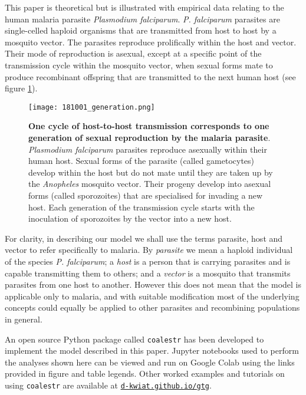 \documentclass[_main.tex]{subfiles}
\begin{document}
This paper is theoretical but is illustrated with empirical data relating to the human malaria parasite \textit{Plasmodium falciparum}.  \textit{P. falciparum} parasites are single-celled haploid organisms that are transmitted from host to host by a mosquito vector.  The parasites reproduce prolifically within the host and vector.  Their mode of reproduction is asexual, except at a specific point of the transmission cycle within the mosquito vector, when sexual forms mate to produce recombinant offspring that are transmitted to the next human host (see figure \ref{fig:one_generation}).

\begin{figure}[h!]
\centering
\texttt{[image: 181001\_generation.png]}
\caption{\textbf{One cycle of host-to-host transmission corresponds to one generation of sexual reproduction by the malaria parasite}.  \textit{Plasmodium falciparum} parasites reproduce asexually within their human host.  Sexual forms of the parasite (called gametocytes) develop within the host but do not mate until they are taken up by the \textit{Anopheles} mosquito vector.  Their progeny develop into asexual forms (called sporozoites) that are specialised for invading a new host.  Each generation of the transmission cycle starts with the inoculation of sporozoites by the vector into a new host.
}
\label{fig:one_generation}
\end{figure}

For clarity, in describing our model we shall use the terms parasite, host and vector to refer specifically to malaria.  By \textit{parasite} we mean a haploid individual of the species \textit{P. falciparum}; a \textit{host} is a person that is carrying parasites and is capable transmitting them to others; and a \textit{vector} is a mosquito that transmits parasites from one host to another.  However this does not mean that the model is applicable only to malaria, and with suitable modification most of the underlying concepts could equally be applied to other parasites and recombining populations in general. 

An open source Python package called \texttt{coalestr} has been developed to implement the model described in this paper.  Jupyter notebooks used to perform the analyses shown here can be viewed and run on Google Colab using the links provided in figure and table legends.  Other worked examples and tutorials on using \texttt{coalestr} are available at \href{https://d-kwiat.github.io/gtg}{\texttt{d-kwiat.github.io/gtg}}.  
\end{document}
